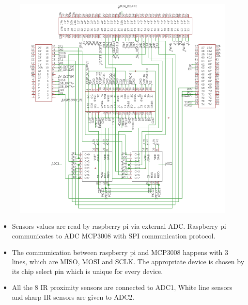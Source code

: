 \documentclass[a4paper,12pt,oneside]{book}
\begin{document}
\section*{\textbf{\fontsize{25}{10}\selectfont{7.Sensors and ADC interface}}}
\begin{figure}[h]
	\includegraphics[width=1\textwidth]{adc}
\end{figure}
\hfill
\begin{itemize}
	\item {Sensors values are read by raspberry pi via external ADC. Raspberry pi communicates to ADC MCP3008 with SPI communication protocol.}
	\item {The communication between raspberry pi and MCP3008 happens with 3 lines, which are MISO, MOSI and SCLK. The appropriate device is chosen by its chip select pin which is unique for every device.}
	\item {All the 8 IR proximity sensors are connected to ADC1, White line sensors and sharp IR sensors are given to ADC2.}
\end{itemize}
\pagebreak
\end{document}
